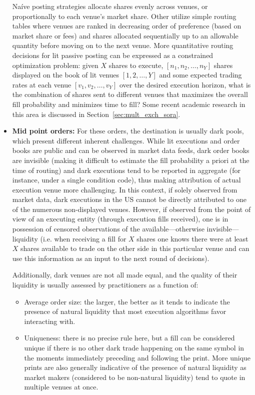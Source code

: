 \begin{itemize}
Na\'ive posting strategies allocate shares evenly across venues, or proportionally to each venue's market share. Other utilize simple routing tables where venues are ranked in decreasing order of preference (based on market share or fees) and shares allocated sequentially up to an allowable quantity before moving on to the next venue. More quantitative routing decisions for lit passive posting can be expressed as a constrained optimization problem: given $X$ shares to execute, $[n_1, n_2, \ldots, n_Y]$ shares displayed on the book of lit venues $[1, 2, \ldots, Y]$ and some expected trading rates at each venue $[v_1, v_2, \ldots, v_Y]$ over the desired execution horizon, what is the combination of shares sent to different venues that maximizes the overall fill probability and minimizes time to fill? Some recent academic research in this area is discussed in Section~\ref{sec:mult_exch_sora}.


\item \textbf{Mid point orders:} For these orders, the destination is usually dark pools, which present different inherent challenges. While lit executions and order books are public and can be observed in market data feeds, dark order books are invisible (making it difficult to estimate the fill probability a priori at the time of routing) and dark executions tend to be reported in aggregate (for instance, under a single condition code), thus making attribution of actual execution venue more challenging. In this context, if solely observed from market data, dark executions in the US cannot be directly attributed to one of the numerous non-displayed venues. However, if observed from the point of view of an executing entity (through execution fills received), one is in possession of censored observations of the available---otherwise invisible---liquidity (i.e. when receiving a fill for $X$ shares one knows there were at least $X$ shares available to trade on the other side in this particular venue and can use this information as an input to the next round of decisions). 


Additionally, dark venues are not all made equal, and the quality of their liquidity is usually assessed by practitioners as a function of: 

\begin{itemize}
\item Average order size: the larger, the better as it tends to indicate the presence of natural liquidity that most execution algorithms favor interacting with.

\item Uniqueness: there is no precise rule here, but a fill can be considered unique if there is no other dark trade happening on the same symbol in the moments immediately preceding and following the print. More unique prints are also generally indicative of the presence of natural liquidity as market makers (considered to be non-natural liquidity) tend to quote in multiple venues at once.


\end{itemize}
\end{itemize}
